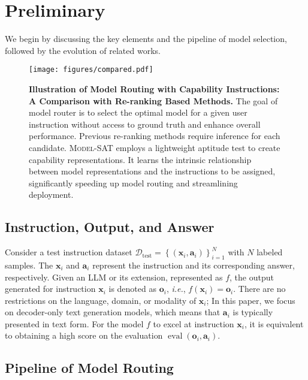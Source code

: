 \section{Preliminary}

We begin by discussing the key elements and the pipeline of model selection, followed by the evolution of related works.


\begin{figure*}[t]
    \centering
    \vspace{-10pt}
    \texttt{[image: figures/compared.pdf]}
    \caption{\textbf{Illustration of Model Routing with Capability Instructions: A Comparison with Re-ranking Based Methods.} The goal of model router is to select the optimal model for a given user instruction without access to ground truth and enhance overall performance. Previous re-ranking methods require inference for each candidate. \textsc{Model-SAT} employs a lightweight aptitude test to create capability representations. It learns the intrinsic relationship between model representations and the instructions to be assigned, significantly speeding up model routing and streamlining deployment.}
    \label{fig:related_works}
    \vspace{-10pt}
\end{figure*}

\subsection{Instruction, Output, and Answer}

Consider a test instruction dataset $\mathcal{D}_{\text{test}} = \left\{ \left(\mathbf{x}_i, \mathbf{a}_i \right)\right\}_{i=1}^{N}$ with $N$ labeled samples. The $\mathbf{x}_i$ and $\mathbf{a}_i$ represent the instruction and its corresponding answer, respectively.
Given an LLM or its extension, represented as $f$, the output generated for instruction $\mathbf{x}_i$ is denoted as $\mathbf{o}_i$, \textit{i.e.}, $f(\mathbf{x}_i) = \mathbf{o}_i$.
There are no restrictions on the language, domain, or modality of $\mathbf{x}_i$; In this paper, we focus on decoder-only text generation models, which means that $\mathbf{a}_i$ is typically presented in text form.
For the model $f$ to excel at instruction $\mathbf{x}_i$, it is equivalent to obtaining a high score on the evaluation $\operatorname{eval}\left( \mathbf{o}_i, \mathbf{a}_i \right)$.

\subsection{Pipeline of Model Routing}

